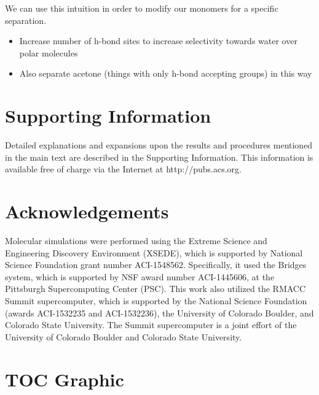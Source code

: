 \documentclass{article}
\begin{document}
  We can use this intuition in order to modify our monomers for a specific 
  separation.
  \begin{itemize}
	\item Increase number of h-bond sites to increase selectivity towards water 
	over polar molecules
	\item Also separate acetone (things with only h-bond accepting groups) in this way
  \end{itemize}
  
 
  \section*{Supporting Information}

  Detailed explanations and expansions upon the results and procedures mentioned in
  the main text are described in the Supporting Information. This information is
  available free of charge via the Internet at http://pubs.acs.org.

  \section*{Acknowledgements}

  Molecular simulations were performed using the Extreme Science and
  Engineering Discovery Environment (XSEDE), which is supported by National
  Science Foundation grant number ACI-1548562. Specifically, it used the Bridges
  system, which is supported by NSF award number ACI-1445606, at the Pittsburgh
  Supercomputing Center (PSC). This work also utilized the RMACC Summit supercomputer,
  which is supported by the National Science Foundation (awards ACI-1532235 and
  ACI-1532236), the University of Colorado Boulder, and Colorado State
  University. The Summit supercomputer is a joint effort of the University of
  Colorado Boulder and Colorado State University.

  \clearpage

  
  

  \newpage

  \section*{TOC Graphic}
\end{document}
